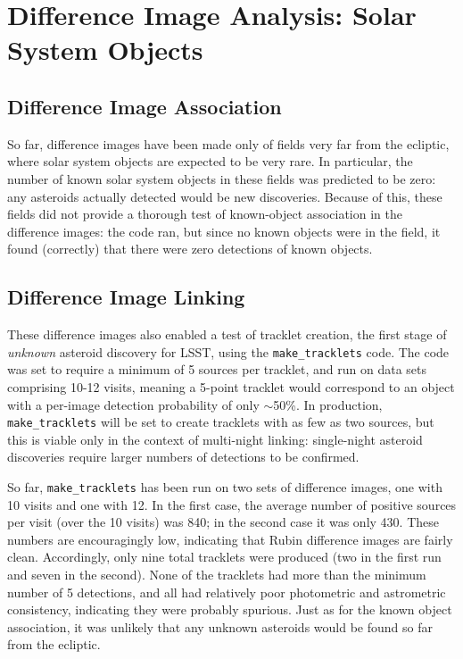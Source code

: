 \section{Difference Image Analysis: Solar System Objects}
\label{sec:dia_solar_system}

\subsection{Difference Image Association}
\label{sec:dia_solar_system_assoc}

So far, difference images have been made only of fields very far from the ecliptic, where solar system objects are expected to be very rare. In particular, the number of known solar system objects in these fields was predicted to be zero: any asteroids actually detected would be new discoveries. Because of this, these fields did not provide a thorough test of known-object association in the difference images: the code ran, but since no known objects were in the field, it found (correctly) that there were zero detections of known objects.

\subsection{Difference Image Linking}
\label{sec:dia_solar_system_link}

These difference images also enabled a test of tracklet creation, the first stage of {\em unknown} asteroid discovery for LSST, using the {\tt make\_tracklets} code. The code was set to require a minimum of 5 sources per tracklet, and run on data sets comprising 10-12 visits, meaning a 5-point tracklet would correspond to an object with a per-image detection probability of only $\sim$50\%. In production, {\tt make\_tracklets} will be set to create tracklets with as few as two sources, but this is viable only in the context of multi-night linking: single-night asteroid discoveries require larger numbers of detections to be confirmed.

So far, {\tt make\_tracklets} has been run on two sets of difference images, one with 10 visits and one with 12.  In the first case, the average number of positive sources per visit (over the 10 visits) was 840; in the second case it was only 430. These numbers are encouragingly low, indicating that Rubin difference images are fairly clean. Accordingly, only nine total tracklets were produced (two in the first run and seven in the second). None of the tracklets had more than the minimum number of 5 detections, and all had relatively poor photometric and astrometric consistency, indicating they were probably spurious. Just as for the known object association, it was unlikely that any unknown asteroids would be found so far from the ecliptic.


